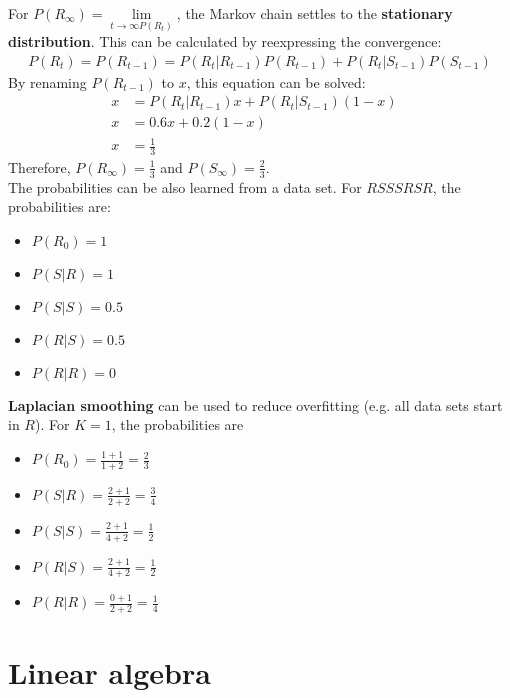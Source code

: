 \documentclass{report}
\begin{document}
For $P(R_\infty)=\lim\limits_{t \rightarrow \infty P(R_t)}$, the Markov chain settles to the {\bf stationary distribution}. This can be calculated by reexpressing the convergence:
\begin{align*}
P(R_t) = P(R_{t-1}) = P(R_t\vert R_{t-1})P(R_{t-1}) + P(R_t\vert S_{t-1})P(S_{t-1})
\end{align*}
By renaming $P(R_{t-1})$ to $x$, this equation can be solved:
\begin{align*}
x &= P(R_t\vert R_{t-1})x + P(R_t\vert S_{t-1})(1-x) &\\
x &= 0.6x + 0.2(1-x) \\
x &= \frac{1}{3}
\end{align*}
Therefore, $P(R_\infty)=\frac{1}{3}$ and $P(S_\infty)=\frac{2}{3}$. \\
The probabilities can be also learned from a data set. For $RSSSRSR$, the probabilities are:
\begin{itemize}
\item $P(R_0)=1$
\item $P(S\vert R)=1$
\item $P(S\vert S)=0.5$
\item $P(R\vert S)=0.5$
\item $P(R\vert R)=0$
\end{itemize}
{\bf Laplacian smoothing} can be used to reduce overfitting (e.g. all data sets start in $R$). For $K=1$, the probabilities are
\begin{itemize}
\item $P(R_0)=\frac{1+1}{1+2}=\frac{2}{3}$
\item $P(S\vert R)=\frac{2+1}{2+2}=\frac{3}{4}$
\item $P(S\vert S)=\frac{2+1}{4+2}=\frac{1}{2}$
\item $P(R\vert S)=\frac{2+1}{4+2}=\frac{1}{2}$
\item $P(R\vert R)=\frac{0+1}{2+2}=\frac{1}{4}$
\end{itemize}


\section{Linear algebra}
\end{document}
